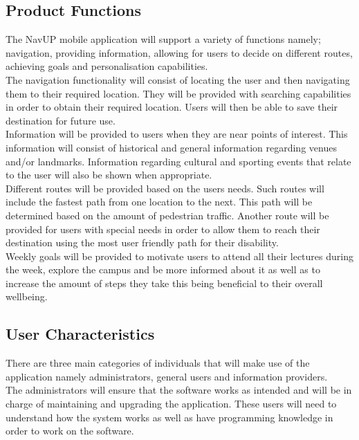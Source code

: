 \documentclass[11pt, a4paper]{article}
\begin{document}
	\subsection{Product Functions}
	The NavUP mobile application will support a variety of functions namely; navigation,  providing information,  allowing for users to decide on different routes,  achieving goals and personalisation capabilities.
	\\

	The navigation functionality will consist of locating the user and then navigating them to their required location. They will be provided with searching capabilities in order to obtain their required location. Users will then be able to save their destination for future use.
	\\

	Information will be provided to users when they are near points of interest. This information will consist of historical and general information regarding venues and/or landmarks. Information regarding cultural and sporting events that relate to the user will also be shown when appropriate.
	\\

	Different routes will be provided based on the users needs. Such routes will include the fastest path from one location to the next. This path will be determined based on the amount of pedestrian traffic. Another route will be provided for users with special needs in order to allow them to reach their destination using the most user friendly path for their disability.
	\\

	Weekly goals will be provided to motivate users to attend all their lectures during the week,  explore the campus and be more informed about it as well as to increase the amount of steps they take this being beneficial to their overall wellbeing.

	\subsection{User Characteristics}
	There are three main categories of individuals that will make use of the application namely administrators,  general users and information providers.
	\\


	The administrators will ensure that the software works as intended and will be in charge of maintaining and upgrading the application. These users will need to understand how the system works as well as have programming knowledge in order to work on the software.
	\\
\end{document}
